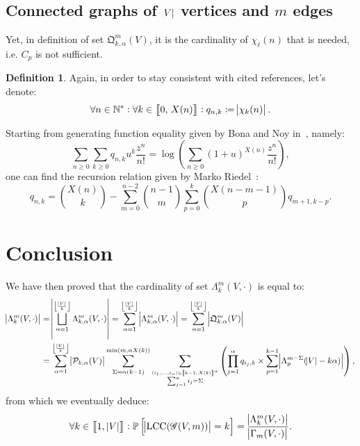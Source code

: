\documentclass{article}
\theoremstyle{definition}
\newtheorem{definition}[lemma]{Definition}
\theoremstyle{remark}
\DeclareMathOperator{\LCC}{LCC}
\renewcommand{\P}{\mathbb P}
\newcommand{\intint}[2]{\left\llbracket#1, \, #2\right\rrbracket}
\newcommand{\floor}[1]{\left\lfloor#1\right\rfloor}
\begin{document}
	\subsection{Connected graphs of $\abs V$ vertices \textbf{and} $m$ edges}
		Yet, in definition of set $\mathfrak Q_{k,\alpha}^m(V)$, it is the cardinality of $\chi_\ell(n)$ that is needed, i.e. $C_p$ is not sufficient.

		\begin{definition} Again, in order to stay consistent with cited references, let's denote:
		\[\forall n \in \mathbb N^* : \forall k \in \intint 0{X(n)} : q_{n,k} \coloneqq \abs {\chi_k(n)}.\]
		\end{definition}

		Starting from generating function equality given by Bona and Noy in~\cite{Bona&Noy2015}, namely:
		\[\sum_{n \geq 0}\sum_{k \geq 0}q_{n,k}u^k\frac {z^n}{n!} = \log\left(\sum_{n \geq 0}(1+u)^{X(n)}\frac {z^n}{n!}\right),\]
		one can find the recursion relation given by Marko Riedel~\cite{Riedelformula}:
		\[q_{n,k} = \binom {X(n)}k - \sum_{m=0}^{n-2}\binom {n-1}m\sum_{p=0}^k\binom {X(n-m-1)}pq_{m+1,k-p}.\]

\section{Conclusion}
	We have then proved that the cardinality of set $\Lambda_k^m(V, \cdot)$ is equal to:
	\begin{align*}
		\abs {\Lambda_k^m(V, \cdot)} &= \abs {\bigsqcup_{\alpha=1}^{\floor {\frac {\abs V}k}}\Lambda_{k,\alpha}^m(V, \cdot)}
			= \sum_{\alpha=1}^{\floor {\frac {\abs V}k}}\abs {\Lambda_{k,\alpha}^m(V, \cdot)} = \sum_{\alpha=1}^{\floor {\frac {\abs V}k}}\abs {\mathfrak Q_{k,\alpha}^m(V)} \\
		&= \sum_{\alpha=1}^{\floor {\frac {\abs V}k}}\abs {\mathcal P_{k,\alpha}(V)}\sum_{\Sigma=\alpha(k-1)}^{\min(m, \alpha X(k))}
			\sum_{\stackrel {(i_1, \ldots, i_\alpha) \in \intint {k-1}{X(k)}^\alpha}{\sum_{j=1}^\alpha i_j = \Sigma}}
			\left(\prod_{j=1}^\alpha q_{i_j,k} \times \sum_{p=1}^{k-1}\abs {\Lambda_p^{m-\Sigma}(\abs V-k\alpha)}\right),
	\end{align*}
	from which we eventually deduce:
	\[\forall k \in \intint 1{\abs V} : \P\left[\abs {\LCC(\mathscr G(V, m))} = k\right] = \frac {\abs {\Lambda_k^m(V, \cdot)}}{\abs {\Gamma_m(V, \cdot)}}.\]

{}

\end{document}
